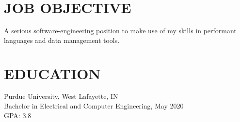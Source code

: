 \documentclass[10pt]{res}
\begin{document}
 
\vspace{-30pt}

\address{\bf  PRESENT ADDRESS\\ 1165 West Stadium Avenue \\ West Lafayette IN 47906-4235 }
\address{\bf PERMANENT ADDRESS \\ 14977 Montclair Drive \\ Westfield, IN, 46074 \\ (317) 363-7700 \\ joseph@gerardot.org/indyjag@gmail.com } 
                                  
\begin{resume}

\vspace{-10pt}\section{JOB OBJECTIVE}          
	A serious software-engineering position to make use of my skills in performant languages
  and data management tools. 
\vspace{-10pt}\section{EDUCATION}          
    Purdue University, West Lafayette, IN \\ 
    Bachelor in Electrical and Computer Engineering, May 2020   \\       
	GPA: 3.8 \\
 

\end{resume}
\end{document}
